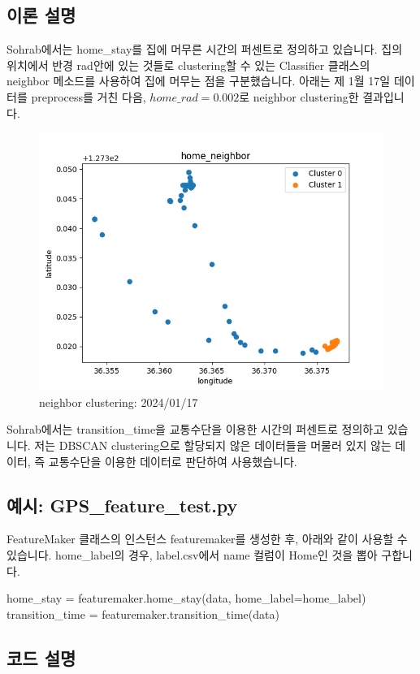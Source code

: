 \documentclass{oblivoir}
\begin{document}
  \subsection{이론 설명}
  Sohrab\cite{Sohrab}에서는 home\_stay를 집에 머무른 시간의 퍼센트로 정의하고 있습니다.
  집의 위치에서 반경 rad안에 있는 것들로 clustering할 수 있는 Classifier 클래스의 neighbor 메소드를 사용하여 집에 머무는 점을 구분했습니다.
  아래는 제 1월 17일 데이터를 preprocess를 거친 다음, $home\_rad=0.002$로 neighbor clustering한 결과입니다.
  \begin{figure}[H]
    \centering
    \caption{neighbor clustering: 2024/01/17}
    \includegraphics[width=.5\textwidth]{GPS_feature_5.png}
  \end{figure}
  Sohrab\cite{Sohrab}에서는 transition\_time을 교통수단을 이용한 시간의 퍼센트로 정의하고 있습니다.
  저는 DBSCAN clustering으로 할당되지 않은 데이터들을 머물러 있지 않는 데이터, 즉 교통수단을 이용한 데이터로 판단하여 사용했습니다.

  \subsection{예시: GPS\_feature\_test.py}
  FeatureMaker 클래스의 인스턴스 featuremaker를 생성한 후, 아래와 같이 사용할 수 있습니다.
  home\_label의 경우, label.csv에서 name 컬럼이 Home인 것을 뽑아 구합니다.
  \begin{python}[label={GPS_feature_28}]
    home_stay = featuremaker.home_stay(data, home_label=home_label)
    transition_time = featuremaker.transition_time(data)
  \end{python}

  \subsection{코드 설명}
\end{document}
